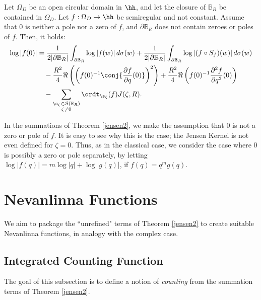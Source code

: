 \documentclass{amsart}
\begin{document}
\begin{teo}\label{jensen2}
     Let $\Omega_D$ be an open circular domain in $\hh$, and let the closure of $\mathbb{B}_R$ be contained in $\Omega_D$. Let $f:\Omega_D\to\hh$ be semiregular and not constant. Assume that $0$ is neither a pole nor a zero of $f$, and $\partial \mathbb B_R$ does not contain zeroes or poles of $f$. Then, it holds:
     \begin{align*}
    \log|f(0)| &= \frac{1}{2|\partial \mathbb B_R|}\int_{\partial \mathbb B_R}\log|f(w)|\,d\sigma(w)+\frac{1}{2|\partial \mathbb B_R|}\int_{\partial \mathbb B_R}\log|(f\circ S_f)(w)|\,d\sigma(w) \\  
   &\quad  -\frac{R^2}{4}\Re \left(\left(f(0)^{-1}\conj{\frac{\partial f}{\partial q}(0)}\right)^2\right)+\frac {R^2}4\Re\left(f(0)^{-1}\frac{\partial^2f}{\partial q^2}(0)\right) \\
    &\quad -\sum_{\substack{
        \s_\zeta\in\mathcal{S}(\mathbb B_R) \\
        \zeta\neq 0
    }}\ordt_{\s_\zeta}(f)J(\zeta,R).\end{align*}
\end{teo}

\begin{remark}\label{zeroHandleRemark}
    In the summations of Theorem \ref{jensen2}, we make the assumption that $0$ is not a zero or pole of $f$. It is easy to see why this is the case; the Jensen Kernel is not even defined for $\zeta=0$. Thus, as in the classical case, we consider the case where $0$ is possibly a zero or pole separately, by letting $\log|f(q)|=m\log |q|+\log|g(q)|$, if $f(q)=q^mg(q)$. 
\end{remark}

\section{Nevanlinna Functions}\label{sec:NevanlinnaFunctions}
We aim to package the ``unrefined" terms of Theorem \ref{jensen2} to create suitable Nevanlinna functions, in analogy with the complex case. 

\subsection{Integrated Counting Function}\label{sec:IntegratedCountingFunction}
The goal of this subsection is to define a notion of \textit{counting} from the summation terms of Theorem \ref{jensen2}. 
\end{document}
